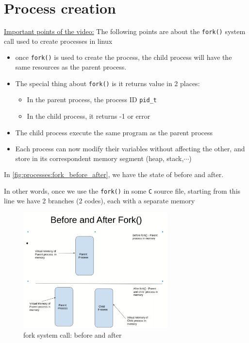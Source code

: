 \documentclass[12pt,a4paper]{book}
\begin{document}
\newpage
\section{Process creation}

\underline{Important points of the video:} The following points are about the \verb|fork()| system call used to create processes in linux


\begin{itemize}

\item once \verb|fork()| is used to create the process, the child process will have the same resources as the parent process.

\item The special thing about \verb|fork()| is it returns value in 2 places:

    \begin{itemize}
        \item In the parent process, the process ID \verb|pid_t|

        \item In the child process, it returns -1 or error
        
    \end{itemize}

\item The child process execute the same program as the parent process

\item Each process can now modify their variables without affecting the other, and store in its correspondent memory segment (heap, stack,$\cdots$) 

\end{itemize}


In \autoref{fig:processes:fork_before_after}, we have the state of before and after. 

In other words, once we use the \verb|fork()| in some \verb|C| source file, starting from this line we have 2 branches (2 codes), each with a separate memory

\begin{figure}[h]
\centering
\includegraphics[width = 0.7\textwidth, frame]{Figures/processes/fork_before_after}
\caption{fork system call: before and after}
\label{fig:processes:fork_before_after}
\end{figure}
\end{document}
